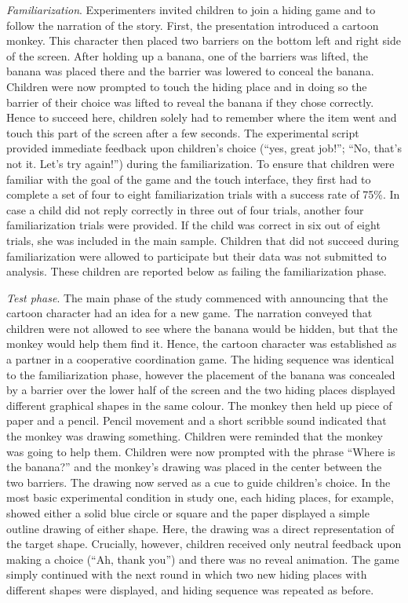 \documentclass[
  man]{apa6}
\begin{document}
\emph{Familiarization}. Experimenters invited children to join a hiding game and to follow the narration of the story. First, the presentation introduced a cartoon monkey. This character then placed two barriers on the bottom left and right side of the screen. After holding up a banana, one of the barriers was lifted, the banana was placed there and the barrier was lowered to conceal the banana. Children were now prompted to touch the hiding place and in doing so the barrier of their choice was lifted to reveal the banana if they chose correctly. Hence to succeed here, children solely had to remember where the item went and touch this part of the screen after a few seconds. The experimental script provided immediate feedback upon children's choice (``yes, great job!''; ``No, that's not it. Let's try again!'') during the familiarization. To ensure that children were familiar with the goal of the game and the touch interface, they first had to complete a set of four to eight familiarization trials with a success rate of 75\%. In case a child did not reply correctly in three out of four trials, another four familiarization trials were provided. If the child was correct in six out of eight trials, she was included in the main sample. Children that did not succeed during familiarization were allowed to participate but their data was not submitted to analysis. These children are reported below as failing the familiarization phase.

\emph{Test phase}. The main phase of the study commenced with announcing that the cartoon character had an idea for a new game. The narration conveyed that children were not allowed to see where the banana would be hidden, but that the monkey would help them find it. Hence, the cartoon character was established as a partner in a cooperative coordination game. The hiding sequence was identical to the familiarization phase, however the placement of the banana was concealed by a barrier over the lower half of the screen and the two hiding places displayed different graphical shapes in the same colour. The monkey then held up piece of paper and a pencil. Pencil movement and a short scribble sound indicated that the monkey was drawing something. Children were reminded that the monkey was going to help them. Children were now prompted with the phrase ``Where is the banana?'' and the monkey's drawing was placed in the center between the two barriers. The drawing now served as a cue to guide children's choice. In the most basic experimental condition in study one, each hiding places, for example, showed either a solid blue circle or square and the paper displayed a simple outline drawing of either shape. Here, the drawing was a direct representation of the target shape. Crucially, however, children received only neutral feedback upon making a choice (``Ah, thank you'') and there was no reveal animation. The game simply continued with the next round in which two new hiding places with different shapes were displayed, and hiding sequence was repeated as before.
\end{document}
